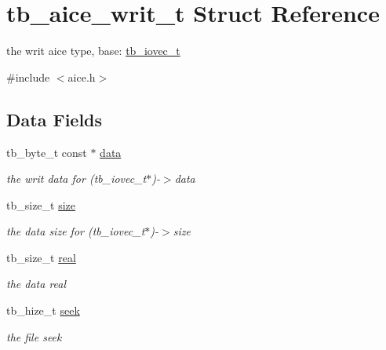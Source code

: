 \hypertarget{structtb__aice__writ__t}{\section{tb\-\_\-aice\-\_\-writ\-\_\-t Struct Reference}
\label{structtb__aice__writ__t}
}


the writ aice type, base\-: \hyperlink{structtb__iovec__t}{tb\-\_\-iovec\-\_\-t}  




{\ttfamily \#include $<$aice.\-h$>$}

\subsection*{Data Fields}
\begin{DoxyCompactItemize}
\item 
\hypertarget{structtb__aice__writ__t_a5f507748da1e2cdd20a6e0f67a36614b}{tb\-\_\-byte\-\_\-t const $\ast$ \hyperlink{structtb__aice__writ__t_a5f507748da1e2cdd20a6e0f67a36614b}{data}}\label{structtb__aice__writ__t_a5f507748da1e2cdd20a6e0f67a36614b}

\begin{DoxyCompactList}\small\item\em the writ data for (tb\-\_\-iovec\-\_\-t$\ast$)-\/$>$data \end{DoxyCompactList}\item 
\hypertarget{structtb__aice__writ__t_af772687d5111a249992e5534e113358b}{tb\-\_\-size\-\_\-t \hyperlink{structtb__aice__writ__t_af772687d5111a249992e5534e113358b}{size}}\label{structtb__aice__writ__t_af772687d5111a249992e5534e113358b}

\begin{DoxyCompactList}\small\item\em the data size for (tb\-\_\-iovec\-\_\-t$\ast$)-\/$>$size \end{DoxyCompactList}\item 
\hypertarget{structtb__aice__writ__t_a872b6a957c47f00ebe206ef8c21ecf49}{tb\-\_\-size\-\_\-t \hyperlink{structtb__aice__writ__t_a872b6a957c47f00ebe206ef8c21ecf49}{real}}\label{structtb__aice__writ__t_a872b6a957c47f00ebe206ef8c21ecf49}

\begin{DoxyCompactList}\small\item\em the data real \end{DoxyCompactList}\item 
\hypertarget{structtb__aice__writ__t_a03504a7c0dbbaf90a5582095e137c8af}{tb\-\_\-hize\-\_\-t \hyperlink{structtb__aice__writ__t_a03504a7c0dbbaf90a5582095e137c8af}{seek}}\label{structtb__aice__writ__t_a03504a7c0dbbaf90a5582095e137c8af}

\begin{DoxyCompactList}\small\item\em the file seek \end{DoxyCompactList}\end{DoxyCompactItemize}


